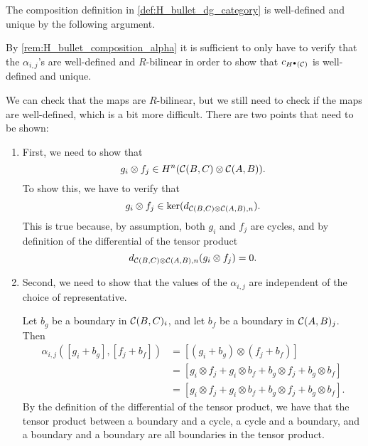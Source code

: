 \begin{remark}
    \label{rem:composition_in_H_bullet_is_well_defined}
    The composition definition in \autoref{def:H_bullet_dg_category} is well-defined and unique by the following argument.

    By \autoref{rem:H_bullet_composition_alpha} it is sufficient to only have to verify that the \( \alpha_{i, j} \)'s are well-defined and \( R \)-bilinear in order to show that \( c_{H^\bullet({\mathcal{C}})} \) is well-defined and unique.

    We can check that the maps are \( R \)-bilinear, but we still need to check if the maps are well-defined, which is a bit more difficult. There are two points that need to be shown:
    \begin{enumerate}
        \item {
            First, we need to show that
            \[
                g_i \otimes f_j \in H^n({\mathcal{C}}(B, C) \otimes {\mathcal{C}}(A, B)).
            \]
            To show this, we have to verify that
            \[
                g_i \otimes f_j \in \ker(d_{{\mathcal{C}}(B, C) \otimes {\mathcal{C}}(A, B), n}).
            \]
            This is true because, by assumption, both \( g_i \) and \( f_j \) are cycles, and by definition of the differential of the tensor product
            \[
                d_{{\mathcal{C}}(B, C) \otimes {\mathcal{C}}(A, B), n}(g_i \otimes f_j) = 0.
            \]
        }
        \item {
            Second, we need to show that the values of the \( \alpha_{i, j} \) are independent of the choice of representative.

            Let \( b_g \) be a boundary in \( {\mathcal{C}}(B, C)_i \), and let \( b_f \) be a boundary in \( {\mathcal{C}}(A, B)_j \). Then
            \begin{align*}
                \alpha_{i, j}([g_i + b_g], [f_j + b_f]) &= [(g_i + b_g) \otimes (f_j + b_f)] \\
                &= [g_i \otimes f_j + g_i \otimes b_f + b_g \otimes f_j + b_g \otimes b_f] \\
                &= [g_i \otimes f_j + g_i \otimes b_f + b_g \otimes f_j + b_g \otimes b_f].
            \end{align*}
            By the definition of the differential of the tensor product, we have that the tensor product between a boundary and a cycle, a cycle and a boundary, and a boundary and a boundary are all boundaries in the tensor product.

}
\end{enumerate}
\end{remark}

